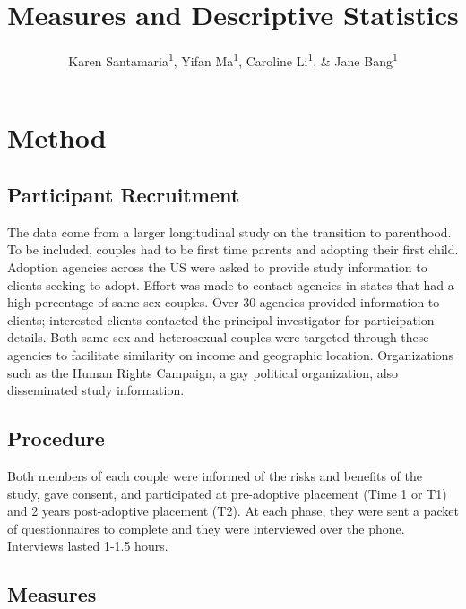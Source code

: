 \documentclass[man]{apa6}
\title{Measures and Descriptive Statistics}
\author{Karen Santamaria\textsuperscript{1}, Yifan Ma\textsuperscript{1}, Caroline Li\textsuperscript{1}, \& Jane Bang\textsuperscript{1}}
\date{}
\affiliation{
\vspace{0.5cm}
\textsuperscript{1} Smith College}
\begin{document}
\maketitle

\hypertarget{method}{%
\section{Method}\label{method}}

\hypertarget{participant-recruitment}{%
\subsection{Participant Recruitment}\label{participant-recruitment}}

The data come from a larger longitudinal study on the transition to parenthood. To be included, couples had to be first time parents and adopting their first child. Adoption agencies across the US were asked to provide study information to clients seeking to adopt. Effort was made to contact agencies in states that had a high percentage of same-sex couples. Over 30 agencies provided information to clients; interested clients contacted the principal investigator for participation details. Both same-sex and heterosexual couples were targeted through these agencies to facilitate similarity on income and geographic location. Organizations such as the Human Rights Campaign, a gay political organization, also disseminated study information.

\hypertarget{procedure}{%
\subsection{Procedure}\label{procedure}}

Both members of each couple were informed of the risks and benefits of the study, gave consent, and participated at pre-adoptive placement (Time 1 or T1) and 2 years post-adoptive placement (T2). At each phase, they were sent a packet of questionnaires to complete and they were interviewed over the phone. Interviews lasted 1-1.5 hours.

\hypertarget{measures}{%
\subsection{Measures}\label{measures}}
\end{document}
